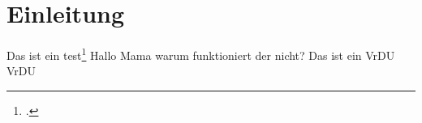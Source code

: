 \chapter{Einleitung}

Das ist ein test\footcite[prenote][postnote]{kim_ocr-free_2021} Hallo Mama warum funktioniert der nicht? Das ist ein VrDU \ac{VrDU}